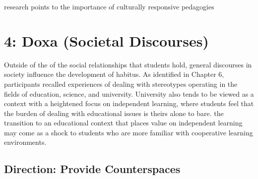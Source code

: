 research points to the importance of culturally responsive pedagogies \citep{glynn2010culturally}


\section{4: Doxa (Societal Discourses)}
Outside of the of the social relationships that students hold, general discourses in society influence the development of habitus. As identified in Chapter 6, participants recalled experiences of dealing with stereotypes operating in the fields of education, science, and university. University also tends to be viewed as a context with a heightened focus on independent learning, where students feel that the burden of dealing with educational issues is theirs alone to bare. the transition to an educational context that places value on independent learning may come as a shock to students who are more familiar with cooperative learning environments.


\subsection{Direction: Provide Counterspaces}



